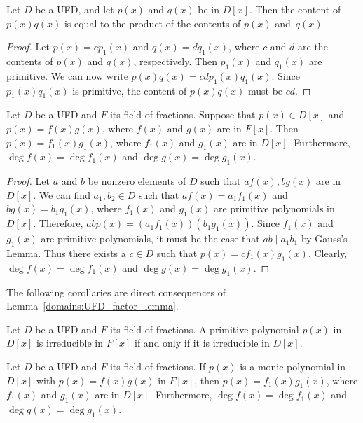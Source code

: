 \begin{lemma}
Let $D$ be a UFD, and let $p(x)$ and $q(x)$ be in $D[x]$. Then the
content of $p(x) q(x)$ is equal to the product of the contents of
$p(x)$ and~$q(x)$.
\end{lemma}

\begin{proof}
Let $p(x) = c p_1(x)$ and $q(x) = d q_1(x)$, where $c$ and $d$ are the
contents of $p(x)$ and $q(x)$, respectively.  Then $p_1(x)$ and
$q_1(x)$ are primitive. We can now write $p(x) q(x) = c d p_1(x)
q_1(x)$. Since $p_1(x) q_1(x)$ is primitive, the content of $p(x)
q(x)$ must be $cd$.
\end{proof}

\begin{lemma}\label{domains:UFD_factor_lemma}
Let $D$ be a UFD and $F$ its field of fractions. Suppose that $p(x)
\in D[x]$ and $p(x) = f(x) g(x)$, where $f(x)$ and $g(x)$ are in 
$F[x]$. Then $p(x) = f_1(x) g_1(x)$, where $f_1(x)$ and $g_1(x)$ are in
$D[x]$.  Furthermore, $\deg f(x) = \deg f_1(x)$ and $\deg g(x) = \deg
g_1(x)$. 
\end{lemma}

\begin{proof}
Let $a$ and $b$ be nonzero elements of $D$ such that $a f(x), b g(x)$
are in $D[x]$. We can find $a_1, b_2 \in D$ such that $a f(x) = a_1
f_1(x)$ and $b g(x) = b_1 g_1(x)$, where $f_1(x)$ and $g_1(x)$ are
primitive polynomials in $D[x]$. Therefore, $a b p(x) = (a_1 f_1(x))(
b_1 g_1(x))$.  Since $f_1(x)$ and $g_1(x)$ are primitive polynomials,
it must be the case that $ab \mid a_1 b_1$ by Gauss's Lemma. Thus there
exists a $c \in D$ such that $p(x) = c f_1(x) g_1(x)$. Clearly, $\deg
f(x) = \deg f_1(x)$ and $\deg g(x) = \deg g_1(x)$. 
\end{proof}

\medskip

The following corollaries are direct consequences of Lemma~\ref{domains:UFD_factor_lemma}. 

\begin{corollary}\label{domains:irred_poly_lemma}
Let $D$ be a UFD and $F$ its field of fractions.  A primitive
polynomial $p(x)$ in $D[x]$ is irreducible in $F[x]$ if and only if it
is irreducible in $D[x]$.
\end{corollary}

\begin{corollary}
Let $D$ be a UFD and $F$ its field of fractions.  If $p(x)$ is a monic
polynomial in $D[x]$ with $p(x) = f(x) g(x)$ in $F[x]$, then $p(x) =
f_1(x) g_1(x)$, where $f_1(x)$ and $g_1(x)$ are in $D[x]$. Furthermore,
$\deg f(x) = \deg f_1(x)$ and $\deg g(x) = \deg g_1(x)$.
\end{corollary}



